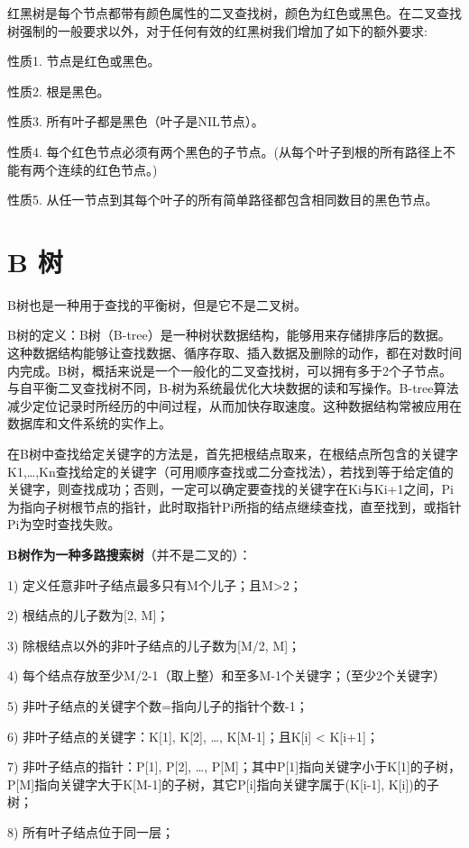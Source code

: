 \documentclass[UTF8,a4paper,12pt]{ctexbook}
\begin{document}
				红黑树是每个节点都带有颜色属性的二叉查找树，颜色为红色或黑色。在二叉查找树强制的一般要求以外，对于任何有效的红黑树我们增加了如下的额外要求:
				
				性质1. 节点是红色或黑色。
				
				性质2. 根是黑色。
				
				性质3. 所有叶子都是黑色（叶子是NIL节点）。
				
				性质4. 每个红色节点必须有两个黑色的子节点。(从每个叶子到根的所有路径上不能有两个连续的红色节点。)
				
				性质5. 从任一节点到其每个叶子的所有简单路径都包含相同数目的黑色节点。
		\section{B 树}
			B树也是一种用于查找的平衡树，但是它不是二叉树。
			
			B树的定义：B树（B-tree）是一种树状数据结构，能够用来存储排序后的数据。这种数据结构能够让查找数据、循序存取、插入数据及删除的动作，都在对数时间内完成。B树，概括来说是一个一般化的二叉查找树，可以拥有多于2个子节点。与自平衡二叉查找树不同，B-树为系统最优化大块数据的读和写操作。B-tree算法减少定位记录时所经历的中间过程，从而加快存取速度。这种数据结构常被应用在数据库和文件系统的实作上。
			
			在B树中查找给定关键字的方法是，首先把根结点取来，在根结点所包含的关键字K1,…,Kn查找给定的关键字（可用顺序查找或二分查找法），若找到等于给定值的关键字，则查找成功；否则，一定可以确定要查找的关键字在Ki与Ki+1之间，Pi为指向子树根节点的指针，此时取指针Pi所指的结点继续查找，直至找到，或指针Pi为空时查找失败。
			
			\textbf{B树作为一种多路搜索树}（并不是二叉的）：
			
			1) 定义任意非叶子结点最多只有M个儿子；且M>2；
			
			2) 根结点的儿子数为[2, M]；
			
			3) 除根结点以外的非叶子结点的儿子数为[M/2, M]；
			
			4) 每个结点存放至少M/2-1（取上整）和至多M-1个关键字；（至少2个关键字）
			
			5) 非叶子结点的关键字个数=指向儿子的指针个数-1；
			
			6) 非叶子结点的关键字：K[1], K[2], …, K[M-1]；且K[i] < K[i+1]；
			
			7) 非叶子结点的指针：P[1], P[2], …, P[M]；其中P[1]指向关键字小于K[1]的子树，P[M]指向关键字大于K[M-1]的子树，其它P[i]指向关键字属于(K[i-1], K[i])的子树；
			
			8) 所有叶子结点位于同一层；
		
\end{document}
